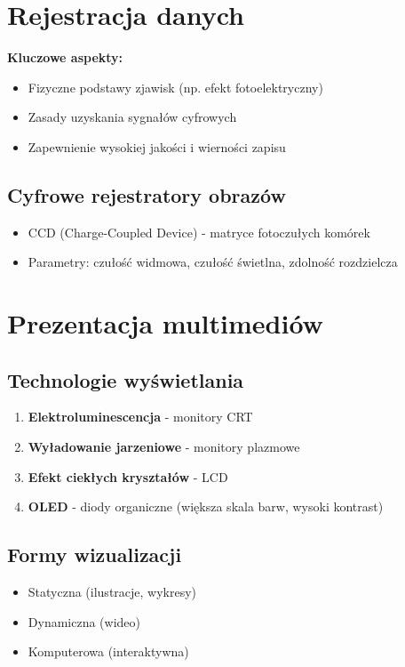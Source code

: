 \documentclass[11pt,a4paper]{article}
\begin{document}
\section{Rejestracja danych}
\textbf{Kluczowe aspekty:}
\begin{itemize}[noitemsep]
    \item Fizyczne podstawy zjawisk (np. efekt fotoelektryczny)
    \item Zasady uzyskania sygnałów cyfrowych
    \item Zapewnienie wysokiej jakości i wierności zapisu
\end{itemize}

\subsection{Cyfrowe rejestratory obrazów}
\begin{itemize}[noitemsep]
    \item CCD (Charge-Coupled Device) - matryce fotoczułych komórek
    \item Parametry: czułość widmowa, czułość świetlna, zdolność rozdzielcza
\end{itemize}

\section{Prezentacja multimediów}
\subsection{Technologie wyświetlania}
\begin{enumerate}[noitemsep]
    \item \textbf{Elektroluminescencja} - monitory CRT
    \item \textbf{Wyładowanie jarzeniowe} - monitory plazmowe
    \item \textbf{Efekt ciekłych kryształów} - LCD
    \item \textbf{OLED} - diody organiczne (większa skala barw, wysoki kontrast)
\end{enumerate}

\subsection{Formy wizualizacji}
\begin{itemize}[noitemsep]
    \item Statyczna (ilustracje, wykresy)
    \item Dynamiczna (wideo)
    \item Komputerowa (interaktywna)
\end{itemize}
\end{document}
